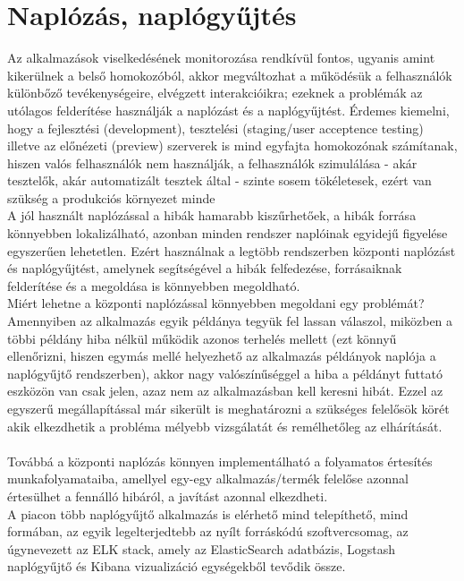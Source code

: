 \section{Naplózás, naplógyűjtés\\}
\label{sect:logging}
Az alkalmazások viselkedésének monitorozása rendkívül fontos, ugyanis amint kikerülnek a belső homokozóból, akkor megváltozhat a működésük a felhasználók különbőző tevékenységeire, elvégzett interakcióikra; ezeknek a problémák az utólagos felderítése használják a naplózást és a naplógyűjtést. Érdemes kiemelni, hogy a fejlesztési (development), tesztelési (staging/user acceptence testing) illetve az előnézeti (preview) szerverek is mind egyfajta homokozónak számítanak, hiszen valós felhasználók nem használják, a felhasználók szimulálása - akár tesztelők, akár automatizált tesztek által - szinte sosem tökéletesek, ezért van szükség a produkciós környezet minde
\\
A jól használt naplózással a hibák hamarabb kiszűrhetőek, a hibák forrása könnyebben lokalizálható, azonban minden rendszer naplóinak egyidejű figyelése egyszerűen lehetetlen. Ezért használnak a legtöbb rendszerben központi naplózást és naplógyűjtést, amelynek segítségével a hibák felfedezése, forrásaiknak felderítése és a megoldása is könnyebben megoldható.\\
Miért lehetne a központi naplózással könnyebben megoldani egy problémát? Amennyiben az alkalmazás egyik példánya tegyük fel lassan válaszol, miközben a többi példány hiba nélkül működik azonos terhelés mellett (ezt könnyű ellenőrizni, hiszen egymás mellé helyezhető az alkalmazás példányok naplója a naplógyűjtő rendszerben), akkor nagy valószínűséggel a hiba a példányt futtató eszközön van csak jelen, azaz nem az alkalmazásban kell keresni hibát. Ezzel az egyszerű megállapítással már sikerült is meghatározni a szükséges felelősök körét akik elkezdhetik a probléma mélyebb vizsgálatát és remélhetőleg az elhárítását.\\
\hfill\\
Továbbá a központi naplózás könnyen implementálható a folyamatos értesítés munkafolyamataiba, amellyel egy-egy alkalmazás/termék felelőse azonnal értesülhet a fennálló hibáról, a javítást azonnal elkezdheti.
\hfill\\
A piacon több naplógyűjtő alkalmazás is elérhető mind telepíthető, mind  formában, az egyik legelterjedtebb az nyílt forráskódú szoftvercsomag, az úgynevezett az ELK stack, amely az ElasticSearch adatbázis, Logstash naplógyűjtő és Kibana vizualizáció egységekből tevődik össze.
\\
